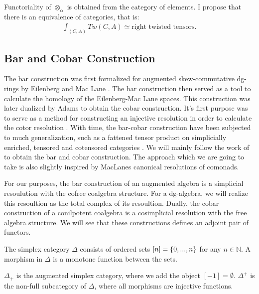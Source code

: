 \documentclass[../thesis.tex]{subfiles}
\begin{document}
            \begin{remark}
                Functoriality of $\otimes_\alpha$ is obtained from the category of elements. I propose that there is an equivalence of categories, that is:
                \begin{align*}
                    \int_{(C,A)} Tw(C,A) \simeq \text{right twisted tensors.}
                \end{align*}
            \end{remark}

    \subsection{Bar and Cobar Construction}

            The bar construction was first formalized for augmented skew-commutative dg-rings by Eilenberg and Mac Lane \cite{Eilenberg53}. The bar construction then served as a tool to calculate the homology of the Eilenberg-Mac Lane spaces. This construction was later dualized by Adams \cite{Adams56} to obtain the cobar construction. It's first purpose was to serve as a method for constructing an injective resolution in order to calculate the cotor resolution \cite{Eilenberg65}. With time, the bar-cobar construction have been subjected to much generalization, such as a fattened tensor product on simplicially enriched, tensored and cotensored categories \cite{Riehl14}. We will mainly follow the work of \cite{Loday12} to obtain the bar and cobar construction. The approach which we are going to take is also slightly inspired by MacLanes\cite{MacLane71} canonical resolutions of comonads.

            For our purposes, the bar construction of an augmented algebra is a simplicial resoulution with the cofree coalgebra structure. For a dg-algebra, we will realize this resoultion as the total complex of its resoultion. Dually, the cobar construction of a conilpotent coalgebra is a cosimplicial resolution with the free algebra structure. We will see that these constructions defines an adjoint pair of functors.

            \begin{definition}
                The simplex category $\Delta$ consists of ordered sets $[n] = \{0,...,n\}$ for any $n\in\mathbb{N}$. A morphism in $\Delta$ is a monotone function between the sets.

                $\Delta_+$ is the augmented simplex category, where we add the object $[-1] = \emptyset$. $\Delta^+$ is the non-full subcategory of $\Delta$, where all morphisms are injective functions.
            \end{definition} 
\end{document}
